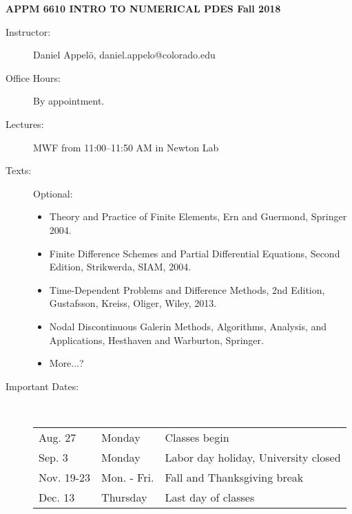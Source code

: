 \documentclass[10pt]{article}
\begin{document}
\baselineskip=12pt
\pagestyle{empty}
\newcommand{\ds}{\displaystyle}
\newcommand{\be}{\begin{enumerate}}
\newcommand{\ee}{\end{enumerate}}


\centerline{\bf APPM 6610 \hfill INTRO TO NUMERICAL PDES
                          \hfill Fall 2018}
\bigskip

\begin{description}
\item[Instructor:] Daniel Appel\"{o}, daniel.appelo@colorado.edu
\item[Office Hours:] By appointment. \\
                   

\item[Lectures:] MWF from 11:00--11:50 AM in Newton Lab

\item[Texts:] Optional: 
\begin{itemize}
\item Theory and Practice of Finite Elements, Ern and Guermond, Springer 2004. 
\item Finite Difference Schemes and Partial Differential Equations, Second Edition, Strikwerda, SIAM, 2004.
\item Time-Dependent Problems and Difference Methods, 2nd Edition, Gustafsson, Kreiss, Oliger, Wiley, 2013.
\item Nodal Discontinuous Galerin Methods, Algorithms, Analysis, and Applications, Hesthaven and Warburton, Springer.
\item More...? 
\end{itemize}
\item[Important Dates:] ~~ \\
     \begin{tabular}{l l l}
     Aug.  27  &  Monday    & Classes begin \\
     Sep.  3  &  Monday  & Labor day holiday, University closed \\
     Nov. 19-23  &  Mon. - Fri. & Fall and Thanksgiving break\\
     Dec. 13  &  Thursday & Last day of classes \\
     \end{tabular}


\end{description}
\end{document}
